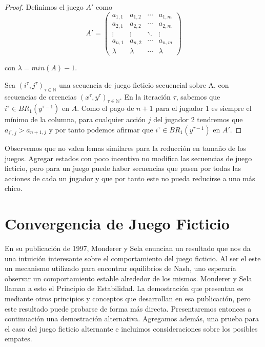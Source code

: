 \begin{proof}
    Definimos el juego $A'$ como
    \begin{equation*}
        A' =
        \begin{pmatrix}
        a_{1,1} & a_{1,2} & \cdots & a_{1,m}     \\
        a_{2,1} & a_{2,2} & \cdots & a_{2,m}    \\
        \vdots  & \vdots  & \ddots & \vdots                  \\
        a_{n,1} & a_{n,2} & \cdots & a_{n,m}    \\
        \lambda & \lambda & \cdots &\lambda
        \end{pmatrix}
    \end{equation*} 

    con $\lambda = min(A) - 1$.
    
    Sea $(i^\tau, j^\tau)_{\tau \in \mathbb{N}}$ una secuencia de juego ficticio secuencial sobre A, con secuencias de creencias $(x^\tau, y^\tau)_{\tau \in \mathbb{N}}$. En la iteración $\tau$, sabemos que $i^\tau \in BR_1(y^{\tau - 1})$ en $A$. Como el pago de $n+1$ para el jugador $1$ es siempre el mínimo de la columna, para cualquier acción $j$ del jugador $2$ tendremos que $a_{i^\tau, j} > a_{n+1,j}$ y por tanto podemos afirmar que $i^\tau \in BR_1(y^{\tau - 1})$ en $A'$.
\end{proof}


Observemos que no valen lemas similares para la reducción en tamaño de los juegos. Agregar estados con poco incentivo no modifica las secuencias de juego ficticio, pero para un juego puede haber secuencias que pasen por todas las acciones de cada un jugador y que por tanto este no pueda reducirse a uno más chico.

\section{Convergencia de Juego Ficticio} \label{sec:convergencia:fp}

En su publicación de 1997, Monderer y Sela \cite{no:cycling} enuncian un resultado que nos da una intuición interesante sobre el comportamiento del juego ficticio. Al ser el este un mecanismo utilizado para encontrar equilibrios de Nash, uno esperaría observar un comportamiento estable alrededor de los mismos. Monderer y Sela llaman a esto el Principio de Estabilidad. La demostración que presentan es mediante otros principios y conceptos que desarrollan en esa publicación, pero este resultado puede probarse de forma más directa. Presentaremos entonces a continuación una demostración alternativa. Agregamos además, una prueba para el caso del juego ficticio alternante e incluimos consideraciones sobre los posibles empates. 

